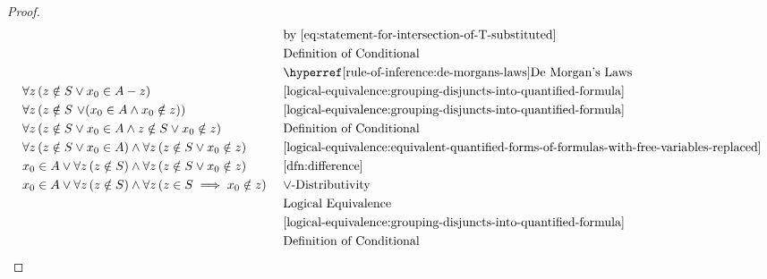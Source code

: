 \begin{proof}
\begin{equation*}
\begin{aligned}
            &\forall z \, \mleft( z \notin S \lor x_{0} \in A - z \mright)\\
            &\forall z \, \mleft( z \notin S \,\,{\lor} \mleft( x_{0} \in A \land x_{0} \notin z \mright) \mright)\\
            &\forall z \, \mleft( z \notin S \lor x_{0} \in A \land z \notin S \lor x_{0} \notin z \mright)\\
            &\forall z \, \mleft( z \notin S \lor x_{0} \in A \mright)
            \land
            \forall z \, \mleft( z \notin S \lor x_{0} \notin z \mright)\\
            &x_{0} \in A \lor \forall z \, \mleft( z \notin S \mright) \land
            \forall z \, \mleft( z \notin S \lor x_{0} \notin z \mright)\\
            &x_{0} \in A \lor \forall z \, \mleft( z \notin S \mright) \land
            \forall z \, \mleft( z \in S \implies x_{0} \notin z \mright)\\
        \end{aligned}
        \text{  }
        \begin{aligned}
            &\quad \text{by \eqref{eq:statement-for-intersection-of-T-substituted}} \\
            &\quad \text{Definition of Conditional}\\
            &\quad \text{\aref{rule-of-inference:de-morgans-laws}{De Morgan's Laws}}\\
            &\quad \text{\cref{logical-equivalence:grouping-disjuncts-into-quantified-formula}}\\
            &\quad \text{\cref{logical-equivalence:grouping-disjuncts-into-quantified-formula}}\\
            &\quad \text{Definition of Conditional}\\
            &\quad \text{\cref{logical-equivalence:equivalent-quantified-forms-of-formulas-with-free-variables-replaced}}\\
            &\quad \text{\cref{dfn:difference}}\\
            &\quad \text{\( \lor \)-Distributivity}\\
            &\quad \text{Logical Equivalence}\\
            &\quad \text{\cref{logical-equivalence:grouping-disjuncts-into-quantified-formula}}\\
            &\quad \text{Definition of Conditional}\\
        \end{aligned}

\end{equation*}
\end{proof}

